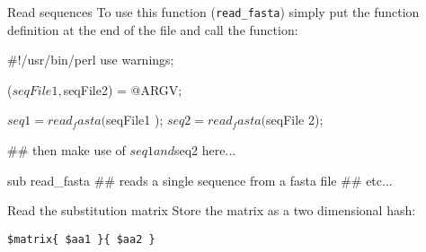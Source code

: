 \documentclass[pdf]{beamer}
\begin{document}
\begin{frame}[fragile]{Read sequences}
  To use this function (\texttt{read\_fasta}) simply put the function
  definition at the end of the file and call the function:

  \begin{perlcode}
    #!/usr/bin/perl 
    use warnings;
    
    ($seqFile1, $seqFile2) = @ARGV;
    
    $seq1 = read_fasta( $seqFile1 );
    $seq2 = read_fasta( $seqFile 2);
    
    ## then make use of $seq1 and $seq2 here...

    sub read_fasta {
      ## reads a single sequence from a fasta file
      ## etc...
    }
  \end{perlcode}
\end{frame}


\begin{frame}[fragile]{Read the substitution matrix}
  Store the matrix as a two dimensional hash:

  \verb|$matrix{ $aa1 }{ $aa2 }|
  
  \begin{figure}[ht]
    \begin{tikzpicture}[scale=0.5]
      
    \end{tikzpicture}
  \end{figure}

\end{frame}
\end{document}
